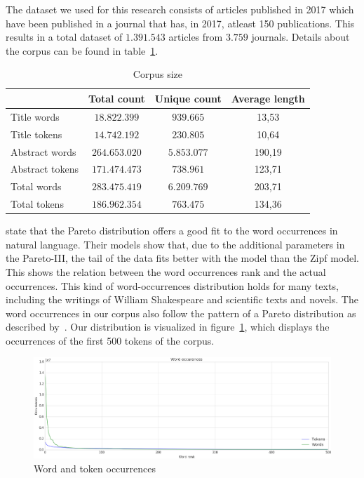\documentclass[../../Thesis.tex]{subfiles}
\begin{document}
The dataset we used for this research consists of articles published in 2017 which have been published in a journal that has, in 2017, atleast 150 publications. This results in a total dataset of $1.391.543$ articles from $3.759$ journals. Details about the corpus can be found in table~\ref{table:corpusSize}.
\begin{table}[hbt]
\begin{center}
\begin{tabular}{|l|c|c|c|}
\hline
 & Total count & Unique count & Average length \\
\hline\hline
Title words & $18.822.399$ & $939.665$ & 13,53  \\
\hline
Title tokens & $14.742.192$ & $230.805$ & 10,64 \\
\hline\hline
Abstract words & $264.653.020$ & $5.853.077$  & 190,19  \\
\hline
Abstract tokens & $171.474.473$ & $738.961$ & 123,71 \\
\hline\hline
Total words & $283.475.419$ & $6.209.769$  & 203,71 \\
\hline
Total tokens & $186.962.354$ & $763.475$ & 134,36 \\
\hline
\end{tabular}
\end{center}
\caption{Corpus size}\label{table:corpusSize}
\end{table}
\clearpage
{}
\citet{wiegand2018word} state that the Pareto distribution offers a good fit to the word occurrences in natural language. Their models show that, due to the additional parameters in the Pareto-III, the tail of the data fits better with the model than the Zipf model. This shows the relation between the word occurrences rank and the actual occurrences. This kind of word-occurrences distribution holds for many texts, including the writings of William Shakespeare and scientific texts and novels\cite{thurner2015understanding}.
The word occurrences in our corpus also follow the pattern of a Pareto distribution as described by~\citet{wiegand2018word}. Our distribution is visualized in figure~\ref{figure:wordTokenOccurrence}, which displays the occurrences of the first 500 tokens of the corpus.
\FloatBarrier
\begin{figure}[hbt]
\includegraphics[width=6.5in]{Plots/word_occurrences}
\caption{Word and token occurrences}\label{figure:wordTokenOccurrence}
\end{figure}
\end{document}
